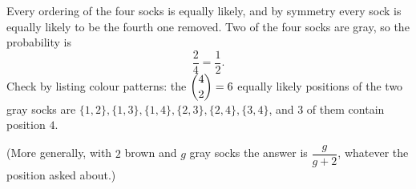 Every ordering of the four socks is equally likely, and by symmetry every sock is equally likely to be the fourth one removed. Two of the four socks are gray, so the probability is
\[
\dfrac{2}{4}=\boxed{\dfrac{1}{2}}.
\]
Check by listing colour patterns: the $\dbinom42=6$ equally likely positions of the two gray socks are $\{1,2\},\{1,3\},\{1,4\},\{2,3\},\{2,4\},\{3,4\}$, and $3$ of them contain position $4$.

(More generally, with $2$ brown and $g$ gray socks the answer is $\dfrac{g}{g+2}$, whatever the position asked about.)
